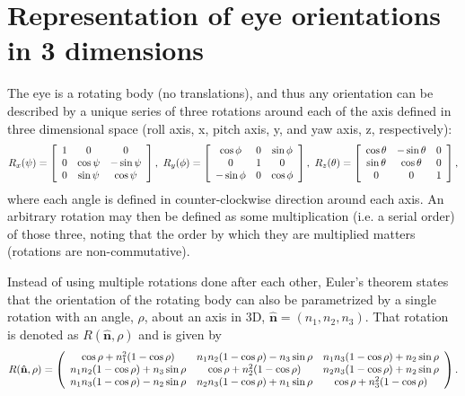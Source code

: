
\section{Representation of eye orientations in 3 dimensions}
\label{cha2:represent}

The eye is a rotating body (no translations), and thus any orientation can be described by a unique series of three rotations around each of the axis defined in three dimensional space (roll axis, x, pitch axis, y, and yaw axis, z, respectively):
\begin{equation}
\label{rrr}
R _ { x } ( \psi ) = \left[ \begin{array} { c c c } { 1 } & { 0 } & { 0 } \\ { 0 } & { \cos \psi } & { - \sin \psi } \\ { 0 } & { \sin \psi } & { \cos \psi} \end{array} \right], \
R _ { y } ( \phi ) = \left[ \begin{array} { c c c } { \cos \phi } & { 0 } & { \sin \phi } \\ { 0 } & { 1 } & { 0 } \\ { - \sin \phi } & { 0 } & { \cos \phi } \end{array} \right], \
R _ { z } ( \theta ) = \left[ \begin{array} { c c c } { \cos \theta } & { - \sin \theta } & { 0 } \\ { \sin \theta } & { \cos \theta } & { 0 } \\ { 0 } & { 0 } & { 1 } \end{array} \right],
\end{equation}
where each angle is defined in counter-clockwise direction around each axis. An arbitrary rotation may then be defined as some multiplication (i.e. a serial order) of those three, noting that the order by which they are multiplied matters (rotations are non-commutative). 

Instead of using multiple rotations done  after each other, Euler's theorem states that the orientation of the rotating body can also be parametrized by a single rotation with an angle, $\rho$, about an axis in 3D, $\hat{\mathbf{n}} = (n_1, n_2, n_3)$. That rotation is denoted as $R(\hat{\mathbf{n}}, \rho)$ and is given by 
\begin{equation}
R ( \hat { \mathbf{n} } , \rho ) = \left( \begin{array} { c c c } { \cos \rho + n _ { 1 } ^ { 2 } ( 1 - \cos \rho ) } & { n _ { 1 } n _ { 2 } ( 1 - \cos \rho ) - n _ { 3 } \sin \rho } & { n _ { 1 } n _ { 3 } ( 1 - \cos \rho ) + n _ { 2 } \sin \rho } \\ { n _ { 1 } n _ { 2 } ( 1 - \cos \rho ) + n _ { 3 } \sin \rho } & { \cos \rho + n _ { 2 } ^ { 2 } ( 1 - \cos \rho ) } & { n _ { 2 } n _ { 3 } ( 1 - \cos \rho ) + n _ { 2 } \sin \rho } \\ { n _ { 1 } n _ { 3 } ( 1 - \cos \rho ) - n _ { 2 } \sin \rho } & { n _ { 2 } n _ { 3 } ( 1 - \cos \rho ) + n _ { 1 } \sin \rho } & { \cos \rho + n _ { 3 } ^ { 2 } ( 1 - \cos \rho ) } \end{array} \right).
\end{equation}

